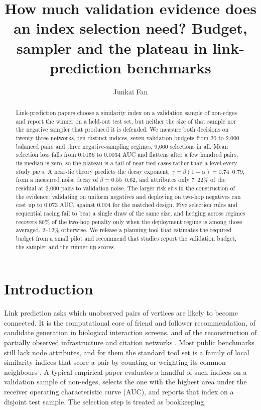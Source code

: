 \documentclass{comjnl}
\title[Validation budget and sampler]{How much validation evidence does an index selection need?
Budget, sampler and the plateau in link-prediction benchmarks}
\author{Junkai Fan}
\affiliation{School of Business Administration, Northeastern University,
Shenyang 110167, China}
\begin{document}
\maketitle

\begin{abstract}
\noindent
Link-prediction papers choose a similarity index on a validation sample of non-edges and
report the winner on a held-out test set, but neither the size of that sample nor the
negative sampler that produced it is defended. We measure both decisions on twenty-three
networks, ten distinct indices, seven validation budgets from 20 to 2{,}000 balanced pairs
and three negative-sampling regimes, 9{,}660 selections in all. Mean selection loss falls
from 0.0156 to 0.0034 AUC and flattens after a few hundred pairs; its median is zero, so
the plateau is a tail of near-tied cases rather than a level every study pays. A near-tie
theory predicts the decay exponent, $\gamma=\beta(1+\alpha)=0.74$--$0.79$, from a measured
noise decay of $\beta=0.55$--$0.62$, and attributes only 7--22\% of the residual at
2{,}000 pairs to validation noise. The larger risk sits in the construction of the
evidence: validating on uniform negatives and deploying on two-hop negatives can cost up
to 0.073 AUC, against 0.004 for the matched design. Five selection rules and sequential
racing fail to beat a single draw of the same size, and hedging across regimes recovers
86\% of the two-hop penalty only when the deployment regime is among those averaged,
2--12\% otherwise. We release a planning tool that estimates the required budget from a
small pilot and recommend that studies report the validation budget, the sampler and the
runner-up scores.
\end{abstract}


\section{Introduction}

Link prediction asks which unobserved pairs of vertices are likely to become connected. It is the computational core of friend and follower recommendation, of candidate generation in biological interaction screens, and of the reconstruction of partially observed infrastructure and citation networks \citep{guimera2009missing,lu2015toward}. Most public benchmarks still lack node attributes, and for them the standard tool set is a family of local similarity indices that score a pair by counting or weighting its common neighbours \citep{libennowell2007link,lu2011link}. A typical empirical paper evaluates a handful of such indices on a validation sample of non-edges, selects the one with the highest area under the receiver operating characteristic curve (AUC), and reports that index on a disjoint test sample. The selection step is treated as bookkeeping.
\end{document}
